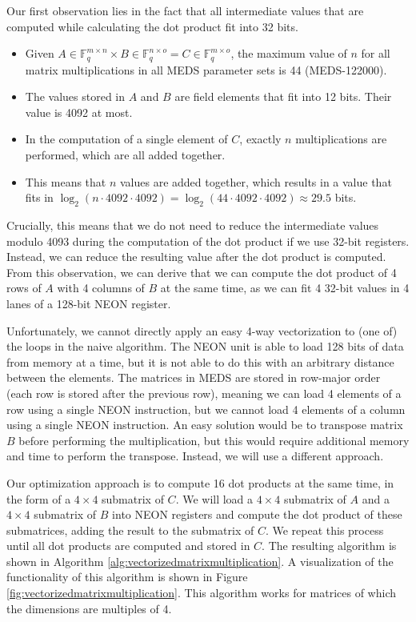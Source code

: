 \documentclass[11pt,a4paper]{report}
\theoremstyle{definition}
\begin{document}
Our first observation lies in the fact that all intermediate values that are computed while calculating the dot product fit into 32 bits.
\begin{itemize}
  \item Given $A \in \mathbb{F}_q^{m \times n} \times B \in \mathbb{F}_q^{n \times o} = C \in \mathbb{F}_q^{m \times o}$, the maximum value of $n$ for all matrix multiplications in all MEDS parameter sets is 44 (MEDS-122000).
  \item The values stored in $A$ and $B$ are field elements that fit into 12 bits. Their value is 4092 at most.
  \item In the computation of a single element of $C$, exactly $n$ multiplications are performed, which are all added together.
  \item This means that $n$ values are added together, which results in a value that fits in $\log_2(n \cdot 4092 \cdot 4092) = \log_2(44 \cdot 4092 \cdot 4092) \approx 29.5$ bits.
\end{itemize}
Crucially, this means that we do not need to reduce the intermediate values modulo 4093 during the computation of the dot product if we use 32-bit registers. Instead, we can reduce the resulting value after the dot product is computed. From this observation, we can derive that we can compute the dot product of 4 rows of $A$ with 4 columns of $B$ at the same time, as we can fit 4 32-bit values in 4 lanes of a 128-bit NEON register.

Unfortunately, we cannot directly apply an easy 4-way vectorization to (one of) the loops in the naive algorithm. The NEON unit is able to load 128 bits of data from memory at a time, but it is not able to do this with an arbitrary distance between the elements. The matrices in MEDS are stored in row-major order (each row is stored after the previous row), meaning we can load 4 elements of a row using a single NEON instruction, but we cannot load 4 elements of a column using a single NEON instruction. An easy solution would be to transpose matrix $B$ before performing the multiplication, but this would require additional memory and time to perform the transpose. Instead, we will use a different approach.

Our optimization approach is to compute 16 dot products at the same time, in the form of a $4\times4$ submatrix of $C$. We will load a $4\times4$ submatrix of $A$ and a $4\times4$ submatrix of $B$ into NEON registers and compute the dot product of these submatrices, adding the result to the submatrix of $C$. We repeat this process until all dot products are computed and stored in $C$. The resulting algorithm is shown in Algorithm \ref{alg:vectorizedmatrixmultiplication}. A visualization of the functionality of this algorithm is shown in Figure \ref{fig:vectorizedmatrixmultiplication}. This algorithm works for matrices of which the dimensions are multiples of 4.
\end{document}
